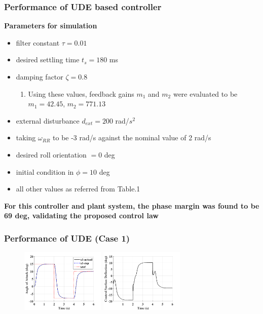 \documentclass[table,10pt,red]{beamer}	%
\begin{document}
\begin{frame}
\frametitle{Performance of UDE based controller}
\textbf{Parameters for simulation}
\begin{itemize}  %
		\item filter constant $\tau=0.01$
		\item desired settling time $t_s= 180$ ms
		\item damping factor $\zeta = 0.8$
				\begin{enumerate}
					\item Using these values, feedback gains $m_1$ and $m_2$ were evaluated to be $m_1=42.45$, $m_2=771.13$ 
				\end{enumerate}
		\item external disturbance $d_{ext}= 200$ rad/$s^2$
		\item taking $\omega_{RR}$ to be -3 rad/s against the nominal value of 2 rad/s
		\item desired roll orientation $=0$ deg
		\item initial condition in $\phi= 10$ deg
		\item all other values as referred from Table.1
	\end{itemize}
	
\textbf{For this controller and plant system, the phase margin was found to be 69 deg, validating the proposed control law}
\end{frame}
\begin{frame}
\frametitle{Performance of UDE (Case 1)}
\begin{figure}
\includegraphics[width=4cm]{1_ude_varying-mach_x1}
\includegraphics[width=4cm]{2_ude_varying-mach_control}
\end{figure}



\end{frame}	
\end{document}
